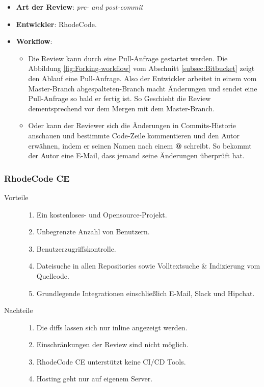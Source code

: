 \begin{itemize}
	\item \textbf{Art der Review}: \textit{pre- and post-commit}
	\item \textbf{Entwickler}: RhodeCode.
	\item \textbf{Workflow}:
	\begin{itemize}
		\item Die Review kann durch eine Pull-Anfrage gestartet werden. Die Abbildung \ref{fig:Forking-workflow} vom Abschnitt \ref{subsec:Bitbucket} zeigt den Ablauf
			eine Pull-Anfrage. Also der Entwickler arbeitet in einem vom Master-Branch abgespalteten-Branch macht Änderungen und sendet eine Pull-Anfrage so bald er fertig ist. 
			So Geschieht die Review dementsprechend vor dem Mergen mit dem Master-Branch.
		\item Oder kann der Reviewer sich die Änderungen in Commits-Historie anschauen und bestimmte Code-Zeile kommentieren und den Autor erwähnen, indem er seinen Namen nach einem 
			\textbf{@} schreibt. So bekommt der Autor eine E-Mail, dass jemand seine Änderungen überprüft hat.
	\end{itemize}
\end{itemize}

\subsubsection{RhodeCode CE}
\label{subsubsec:RhodeCode CE}

\begin{description}
	\item [Vorteile] \hfill
		\begin{enumerate}
			\item Ein kostenloses- und Opensource-Projekt.
			\item Unbegrenzte Anzahl von Benutzern.
			\item Benutzerzugriffskontrolle.
			\item Dateisuche in allen Repositories sowie Volltextsuche \& Indizierung vom Quellcode.
			\item Grundlegende Integrationen einschließlich E-Mail, Slack und Hipchat.
		\end{enumerate}
	\item [Nachteile] \hfill
		\begin{enumerate}
			\item Die diffs lassen sich nur inline angezeigt werden.
			\item Einschränkungen der Review sind nicht möglich.
			\item RhodeCode CE unterstützt keine \ac{CI}/\ac{CD} Tools.
			\item Hosting geht nur auf eigenem Server.
		\end{enumerate}
\end{description}

